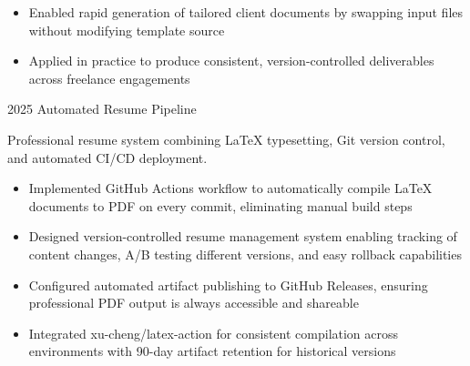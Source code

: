 \documentclass[9pt]{developercv} %
\begin{document}
\begin{entrylist}
{\begin{itemize}[noitemsep,topsep=0pt,parsep=0pt,partopsep=0pt, leftmargin=15pt]
        \item Enabled rapid generation of tailored client documents by swapping input files without modifying template source
        \item Applied in practice to produce consistent, version-controlled deliverables across freelance engagements
    \end{itemize}
    }
    \entry
    {2025}
    {Automated Resume Pipeline}
    {}
    {\vspace{-10pt}
    \begin{flushleft}
        Professional resume system combining LaTeX typesetting, Git version control, and automated CI/CD deployment.
    \end{flushleft}
    \begin{itemize}[noitemsep,topsep=0pt,parsep=0pt,partopsep=0pt, leftmargin=15pt]
                \item Implemented GitHub Actions workflow to automatically compile LaTeX documents to PDF on every commit, eliminating manual build steps
                \item Designed version-controlled resume management system enabling tracking of content changes, A/B testing different versions, and easy rollback capabilities
                \item Configured automated artifact publishing to GitHub Releases, ensuring professional PDF output is always accessible and shareable
                \item Integrated xu-cheng/latex-action for consistent compilation across environments with 90-day artifact retention for historical versions
            \end{itemize}


}
\end{entrylist}
\end{document}
